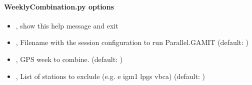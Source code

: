 \documentclass[letterpaper,10pt,english]{sphinxmanual}
\begin{document}
\paragraph{WeeklyCombination.py options}
\label{\detokenize{parallel_gamit:WeeklyCombination.py-options}}\begin{itemize}
\item {} 
\sphinxAtStartPar
{\hyperref[\detokenize{parallel_gamit:WeeklyCombination.py--h}]{}}, {\hyperref[\detokenize{parallel_gamit:WeeklyCombination.py---help}]{}} \sphinxhyphen{} show this help message and exit

\item {} 
\sphinxAtStartPar
{\hyperref[\detokenize{parallel_gamit:WeeklyCombination.py--s}]{}} , {\hyperref[\detokenize{parallel_gamit:WeeklyCombination.py---session_config}]{}}  \sphinxhyphen{} Filename with the session configuration to run Parallel.GAMIT (default: )

\item {} 
\sphinxAtStartPar
{\hyperref[\detokenize{parallel_gamit:WeeklyCombination.py--w}]{}} , {\hyperref[\detokenize{parallel_gamit:WeeklyCombination.py---gpsweek}]{}}  \sphinxhyphen{} GPS week to combine. (default: )

\item {} 
\sphinxAtStartPar
{\hyperref[\detokenize{parallel_gamit:WeeklyCombination.py--e}]{}} , {\hyperref[\detokenize{parallel_gamit:WeeklyCombination.py---exclude}]{}}  \sphinxhyphen{} List of stations to exclude (e.g. \sphinxhyphen{}e igm1 lpgs vbca) (default: )

\end{itemize}
\end{document}
